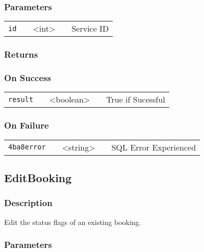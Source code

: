 \documentclass[a4paper,12pt]{article}
\begin{document}
\subsubsection{Parameters}

\begin{tabular}{ccccc}
\verb!id! & \vspace{15mm} & <int> & \vspace{15mm} & Service ID \\
\end{tabular}

\subsubsection{Returns}

\subsubsection{On Success}

\begin{tabular}{ccccc}
\verb!result! & \vspace{15mm} & <boolean> & \vspace{15mm} & True if Sucessful \\
\end{tabular}

\subsubsection{On Failure}

\begin{tabular}{ccccc}
\verb!4ba8error! & \vspace{15mm} & <string> & \vspace{15mm} & SQL Error Experienced \\
\end{tabular}


\subsection{EditBooking}

\subsubsection{Description}

Edit the status flags of an existing booking.

\subsubsection{Parameters}
\end{document}

